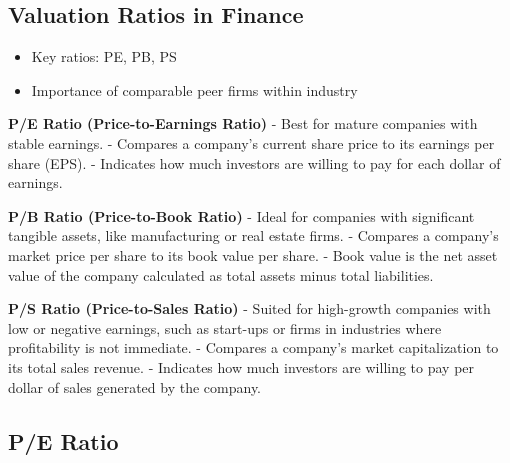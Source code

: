 \documentclass[
]{book}
\providecommand{\tightlist}{%
  \setlength{\itemsep}{0pt}\setlength{\parskip}{0pt}}
\begin{document}
\hypertarget{valuation-ratios-in-finance}{%
\subsection{Valuation Ratios in
Finance}\label{valuation-ratios-in-finance}}

\begin{itemize}
\tightlist
\item
  Key ratios: PE, PB, PS
\item
  Importance of comparable peer firms within industry
\end{itemize}

\textbf{P/E Ratio (Price-to-Earnings Ratio)} - Best for mature companies
with stable earnings. - Compares a company's current share price to its
earnings per share (EPS). - Indicates how much investors are willing to
pay for each dollar of earnings.

\textbf{P/B Ratio (Price-to-Book Ratio)} - Ideal for companies with
significant tangible assets, like manufacturing or real estate firms. -
Compares a company's market price per share to its book value per share.
- Book value is the net asset value of the company calculated as total
assets minus total liabilities.

\textbf{P/S Ratio (Price-to-Sales Ratio)} - Suited for high-growth
companies with low or negative earnings, such as start-ups or firms in
industries where profitability is not immediate. - Compares a company's
market capitalization to its total sales revenue. - Indicates how much
investors are willing to pay per dollar of sales generated by the
company.

\hypertarget{pe-ratio}{%
\subsection{P/E Ratio}\label{pe-ratio}}
\end{document}
